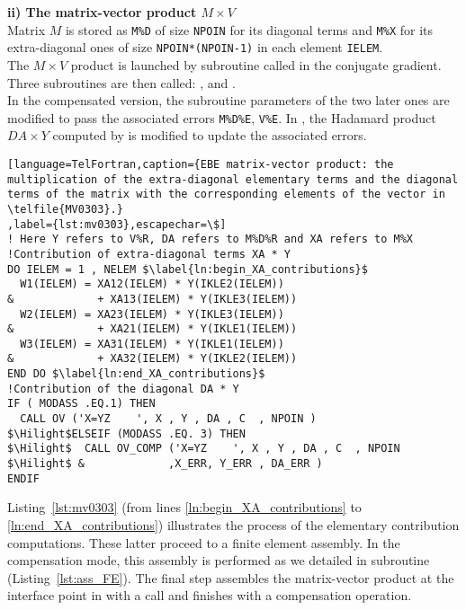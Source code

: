 %
\textbf{ii) The matrix-vector product $M \times V$}\\
Matrix $M$ is stored as \texttt{M\%D} of size \texttt{NPOIN}
for its diagonal terms and \texttt{M\%X} for its extra-diagonal ones
of size \texttt{NPOIN*(NPOIN-1)}
in each element \texttt{IELEM}.\\
%
The $M \times V$ product is launched by subroutine 
called in the conjugate gradient.
Three subroutines are then called: , 
and .\\
In the compensated version, the subroutine parameters of
the two later ones are modified
to pass the associated errors \texttt{M\%D\%E}, \texttt{V\%E}.
In , the Hadamard product $DA \times Y$ computed
by  is modified to update the associated errors.
%
\begin{lstlisting}[language=TelFortran,caption={EBE matrix-vector product: the multiplication of the extra-diagonal elementary terms and the diagonal terms of the matrix with the corresponding elements of the vector in \telfile{MV0303}.}
,label={lst:mv0303},escapechar=\$]
! Here Y refers to V%R, DA refers to M%D%R and XA refers to M%X
!Contribution of extra-diagonal terms XA * Y
DO IELEM = 1 , NELEM $\label{ln:begin_XA_contributions}$
  W1(IELEM) = XA12(IELEM) * Y(IKLE2(IELEM))
&             + XA13(IELEM) * Y(IKLE3(IELEM))
  W2(IELEM) = XA23(IELEM) * Y(IKLE3(IELEM))
&             + XA21(IELEM) * Y(IKLE1(IELEM))
  W3(IELEM) = XA31(IELEM) * Y(IKLE1(IELEM))
&             + XA32(IELEM) * Y(IKLE2(IELEM))
END DO $\label{ln:end_XA_contributions}$
!Contribution of the diagonal DA * Y
IF ( MODASS .EQ.1) THEN
  CALL OV ('X=YZ    ', X , Y , DA , C  , NPOIN )
$\Hilight$ELSEIF (MODASS .EQ. 3) THEN
$\Hilight$  CALL OV_COMP ('X=YZ    ', X , Y , DA , C  , NPOIN
$\Hilight$ &             ,X_ERR, Y_ERR , DA_ERR	)
ENDIF
\end{lstlisting}
%
Listing~\ref{lst:mv0303} (from lines \ref{ln:begin_XA_contributions} to
\ref{ln:end_XA_contributions}) illustrates the process of the
elementary contribution computations.
These latter proceed to a finite element assembly.
In the compensation mode, this assembly is performed as we detailed
in subroutine  (Listing~\ref{lst:ass_FE}).
%
The final step assembles the matrix-vector product
at the interface point in  with a  call
and finishes with a compensation operation.
%
